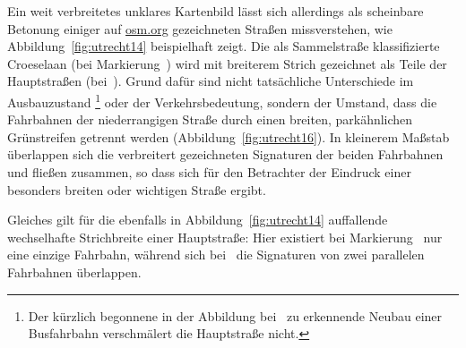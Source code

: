 \documentclass[../main/thesis.tex]{subfiles}
\begin{document}
\label{dual-highway-case-1}

Ein weit verbreitetes unklares Kartenbild lässt sich allerdings als scheinbare Betonung einiger auf \url{osm.org} gezeichneten Straßen missverstehen, wie Abbildung~\ref{fig:utrecht14} beispielhaft zeigt.
Die als Sammelstraße klassifizierte Croeselaan (bei Markierung~) wird mit breiterem Strich gezeichnet als Teile der Hauptstraßen (bei~).
Grund dafür sind nicht tatsächliche Unterschiede im Ausbauzustand%
\footnote{Der kürzlich begonnene in der Abbildung bei~ zu erkennende Neubau einer Busfahrbahn verschmälert die Hauptstraße nicht.}
oder der Verkehrsbedeutung, sondern der Umstand, dass die Fahrbahnen der niederrangigen Straße durch einen breiten, parkähnlichen Grünstreifen getrennt werden  (Abbildung~\ref{fig:utrecht16}).
In kleinerem Maßstab überlappen sich die verbreitert gezeichneten Signaturen der beiden Fahrbahnen und fließen zusammen, so dass sich für den Betrachter der Eindruck einer besonders breiten oder wichtigen Straße ergibt.

Gleiches gilt für die ebenfalls in Abbildung~\ref{fig:utrecht14} auffallende wechselhafte Strichbreite einer Hauptstraße:
Hier existiert bei Markierung~ nur eine einzige Fahrbahn, während sich bei~ die Signaturen von zwei parallelen Fahrbahnen überlappen.

\end{document}
